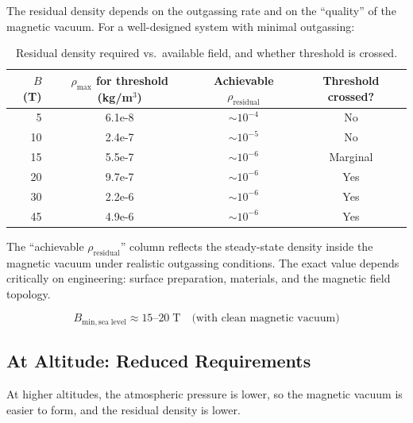 \documentclass[11pt,a4paper]{article}
\begin{document}
The residual density depends on the outgassing rate and on the ``quality'' of the
magnetic vacuum. For a well-designed system with minimal outgassing:

\begin{table}[h]
\centering
\caption{Residual density required vs.\ available field, and whether threshold is crossed.}
\begin{tabular}{rSSc}
\toprule
{$B$ (T)} & {$\rho_{\mathrm{max}}$ for threshold (kg/m$^3$)} & {Achievable $\rho_{\mathrm{residual}}$} & {Threshold crossed?} \\
   & 6.1e-8   & $\sim 10^{-4}$  & No \\
10  & 2.4e-7   & $\sim 10^{-5}$  & No \\
15  & 5.5e-7   & $\sim 10^{-6}$  & Marginal \\
20  & 9.7e-7   & $\sim 10^{-6}$  & Yes \\
30  & 2.2e-6   & $\sim 10^{-6}$  & Yes \\
45  & 4.9e-6   & $\sim 10^{-6}$  & Yes \\
\bottomrule
\end{tabular}
\end{table}

The ``achievable $\rho_{\mathrm{residual}}$'' column reflects the steady-state
density inside the magnetic vacuum under realistic outgassing conditions. The
exact value depends critically on engineering: surface preparation, materials,
and the magnetic field topology.

\begin{equation}
\boxed{B_{\mathrm{min,sea\;level}} \approx 15\text{--}20\;\mathrm{T}
\quad\text{(with clean magnetic vacuum)}}
\end{equation}

\subsection{At Altitude: Reduced Requirements}

At higher altitudes, the atmospheric pressure is lower, so the magnetic vacuum
is easier to form, and the residual density is lower.
\end{document}
